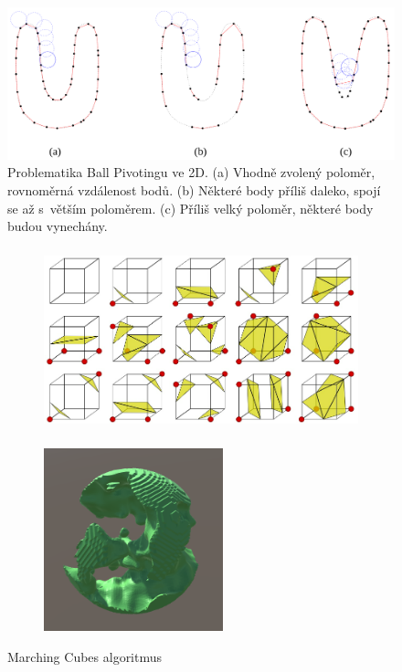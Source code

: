 \documentclass[12pt]{report}			%
\begin{document}
                    \begin{figure}[h]
                            \centering
                            \includegraphics[width=12cm]{images/problematikaPivotingu.png}
                            \caption{Problematika Ball Pivotingu ve 2D. (a) Vhodně zvolený poloměr, rovnoměrná vzdálenost bodů. (b) Některé body příliš daleko, spojí se až s~větším poloměrem. (c) Příliš velký poloměr, některé body budou vynechány. \cite{ballpivot}}
                    \end{figure}

                \begin{figure}[t!bh]
                    \centering
                    \begin{subfigure}{10cm}
                        \centering
                        \includegraphics[height=5.3cm]{images/marchingCases.png}
                    \end{subfigure}
                    \hfill
                    \begin{subfigure}{6cm}
                        \centering
                        \includegraphics[height=5.3cm]{images/marchingCubesMesh.png}
                    \end{subfigure}
                    \caption{Marching Cubes algoritmus}
                \end{figure}
           
\end{document}
